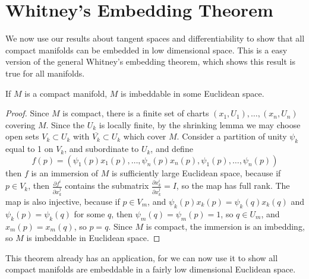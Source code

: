 \section{Whitney's Embedding Theorem}

We now use our results about tangent spaces and differentiability to show that all compact manifolds can be embedded in low dimensional space. This is a easy version of the general Whitney's embedding theorem, which shows this result is true for all manifolds.

\begin{lemma}
    If $M$ is a compact manifold, $M$ is imbeddable in some Euclidean space.
\end{lemma}
\begin{proof}
    Since $M$ is compact, there is a finite set of charts $(x_1,U_1), \dots, (x_n,U_n)$ covering $M$. Since the $U_k$ is locally finite, by the shrinking lemma we may choose open sets $V_k \subset U_k$ with $\overline{V_k} \subset U_k$ which cover $M$. Consider a partition of unity $\psi_k$ equal to 1 on $V_k$, and subordinate to $U_k$, and define
    \[ f(p) = (\psi_1(p) x_1(p), \dots, \psi_n(p) x_n(p), \psi_1(p), \dots, \psi_n(p)) \]
    then $f$ is an immersion of $M$ is sufficiently large Euclidean space, because if $p \in V_k$, then $\frac{\partial f^i}{\partial x_k^j}$ contains the submatrix $\frac{\partial x_k^i}{\partial x_k^j} = I$, so the map has full rank. The map is also injective, because if $p \in V_m$, and $\psi_k(p) x_k(p) = \psi_k(q) x_k(q)$ and $\psi_k(p) = \psi_k(q)$ for some $q$, then $\psi_m(q) = \psi_m(p) = 1$, so $q \in U_m$, and $x_m(p) = x_m(q)$, so $p = q$. Since $M$ is compact, the immersion is an imbedding, so $M$ is imbeddable in Euclidean space.
\end{proof}

This theorem already has an application, for we can now use it to show all compact manifolds are embeddable in a fairly low dimensional Euclidean space.

